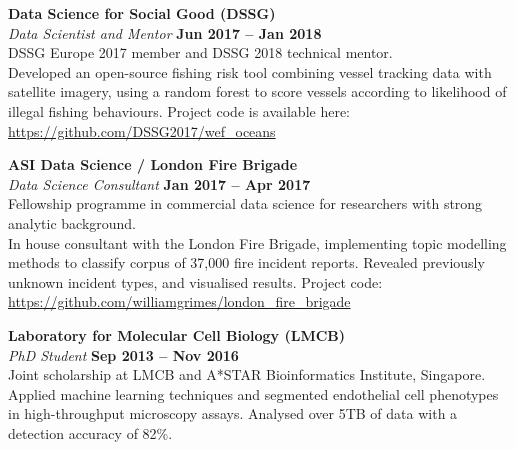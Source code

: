 \documentclass[margin,line]{resume}
\begin{document}
\begin{resume}
    \textbf{\listing Data Science for Social Good (DSSG)} \vspace{2mm}\\\vspace{1mm}%
    \textsl{Data Scientist and Mentor} \hfill \textbf{Jun 2017 -- Jan 2018}\\
    DSSG Europe 2017 member and DSSG 2018 technical mentor. \\
     Developed an open-source fishing risk tool combining vessel tracking data with satellite imagery, using a random forest to score vessels according to likelihood of illegal fishing behaviours. Project code is available here: \url{https://github.com/DSSG2017/wef_oceans}

    \textbf{\listing ASI Data Science / London Fire Brigade} \vspace{2mm}\\\vspace{1mm}%
    \textsl{Data Science Consultant} \hfill \textbf{Jan 2017 -- Apr 2017}\\
    Fellowship programme in commercial data science for researchers with strong analytic background. \\
     In house consultant with the London Fire Brigade, implementing topic modelling methods to classify corpus of 37,000 fire incident reports. Revealed previously unknown incident types, and visualised results. Project code: \url{https://github.com/williamgrimes/london_fire_brigade}

    \textbf{\listing Laboratory for Molecular Cell Biology (LMCB)} \vspace{2mm}\\\vspace{1mm}%
    \textsl{PhD Student} \hfill \textbf{Sep 2013 -- Nov 2016}\\
	Joint scholarship at LMCB and A*STAR Bioinformatics Institute, Singapore. \\
	 Applied machine learning techniques and segmented endothelial cell phenotypes in high-throughput microscopy assays. Analysed over 5TB of data with a detection accuracy of 82$\%$.


\end{resume}
\end{document}
